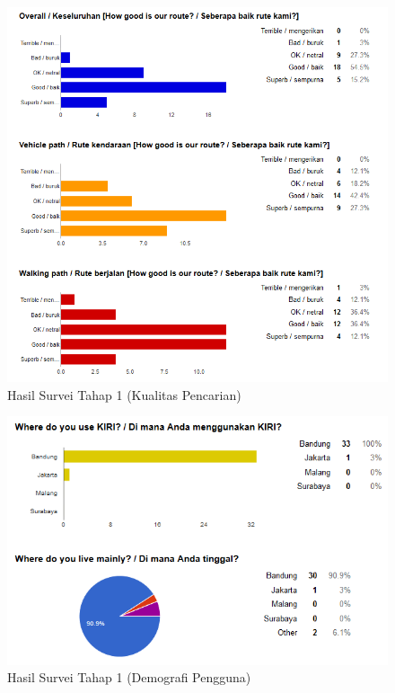 \begin{figure}
	\centering
	\includegraphics[scale=0.75]{Gambar/5_hasilsurvei_1_1}
	\caption{Hasil Survei Tahap 1 (Kualitas Pencarian)} 
	\label{fig:5_hasilsurvei_1_1}
\end{figure}

\begin{figure}
	\centering
	\includegraphics[scale=0.75]{Gambar/5_hasilsurvei_1_2}
	\caption{Hasil Survei Tahap 1 (Demografi Pengguna)} 
	\label{fig:5_hasilsurvei_1_2}
\end{figure}

